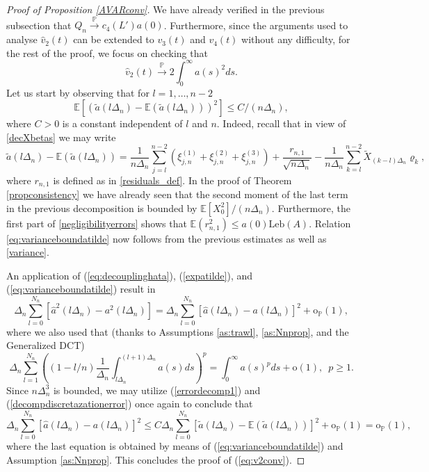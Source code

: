 \documentclass{article}
\theoremstyle{plain}
\theoremstyle{definition}
\theoremstyle{remark}
\begin{document}
\begin{appendix}
\begin{proof}[Proof of Proposition \ref{AVARconv}] We have already verified in the previous subsection
	that \linebreak $Q_{n}\overset{\mathbb{P}}{\rightarrow}c_{4}(L')a(0)$. Furthermore,
	since the arguments used to analyse $\hat{v}_{2}(t)$ can be extended
	to $v_{3}(t)$ and $v_{4}(t)$ without any difficulty, for the rest
	of the proof, we focus on checking that 
	\begin{equation}
		\hat{v}_{2}(t)\overset{\mathbb{P}}{\rightarrow}2\int_{0}^{\infty}a(s)^{2}ds.\label{eq:v2conv}
	\end{equation}
Let us start by observing that for $l=1,\ldots,n-2$
\begin{equation}
	\mathbb{E}[(\tilde{a}(l\Delta_{n})-\mathbb{E}(\tilde{a}(l\Delta_{n})))^{2}]\leq C/(n\Delta_{n}),\label{eq:varianceboundatilde}
\end{equation}
where $C>0$ is a constant independent of $l$ and $n$. Indeed, recall that in view of \eqref{decXbetas} we may write
\[\tilde{a}(l\Delta_{n})-\mathbb{E}(\tilde{a}(l\Delta_{n}))=\frac{1}{n\Delta_{n}}\sum_{j=l}^{n-2}(\xi_{j,n}^{(1)}+\xi_{j,n}^{(2)}+\xi_{j,n}^{(3)})+\frac{r_{n,1}}{\sqrt{n\Delta_{n}}}-\frac{1}{n\Delta_{n}}\sum_{k=l}^{n-2}\tilde{X}_{(k-l)\Delta_{n}}\varrho_{k},
\]
where $r_{n,1}$ is defined as in \eqref{residuals_def}. In the proof of Theorem  \ref{propconsistency} we have already seen that the second moment of the last term in the previous decomposition is bounded by $\mathbb{E}[X_{0}^{2}]/(n\Delta_n)$. Furthermore, the first part of \eqref{negligibilityerrors} shows that $\mathbb{E}(r_{n,1}^2)\leq a(0)\mathrm{Leb}(A)$. Relation \eqref{eq:varianceboundatilde} now follows from the previous estimates as well as \eqref{variance}.

	An application of (\ref{eq:decouplinghata}), (\ref{expatilde}),
	and (\ref{eq:varianceboundatilde}) result in
	\[
	\Delta_{n}\sum_{l=0}^{N_{n}}[\hat{a}^{2}(l\Delta_{n})-a^{2}(l\Delta_{n})]=\Delta_{n}\sum_{l=0}^{N_{n}}[\hat{a}(l\Delta_{n})-a(l\Delta_{n})]^{2}+\mathrm{o}_{\mathbb{P}}(1),
	\]
	where we also used that (thanks to Assumptions \ref{as:trawl}, \ref{as:Nnprop}, and
	the Generalized DCT)
	\[
	\Delta_{n}\sum_{l=1}^{N_{n}}\left((1-l/n)\frac{1}{\Delta_{n}}\int_{l\Delta_{n}}^{(l+1)\Delta_{n}}a(s)ds \right) ^{p}=\int_{0}^{\infty}a(s)^{p}ds+\mathrm{o}(1),\,\,\,p\geq1.
	\]
	Since $n\Delta_{n}^{3}$ is bounded, we may utilize (\ref{errordecomp1})
	and (\ref{decompdiscretazationerror}) once again to conclude that
	\[
	\Delta_{n}\sum_{l=0}^{N_{n}}[\hat{a}(l\Delta_{n})-a(l\Delta_{n})]^{2}\leq C\Delta_{n}\sum_{l=0}^{N_{n}}[\tilde{a}(l\Delta_{n})-\mathbb{E}(\tilde{a}(l\Delta_{n}))]^{2}+\mathrm{o}_{\mathbb{P}}(1)=\mathrm{o}_{\mathbb{P}}(1),
	\]
	where the last equation is obtained by means of (\ref{eq:varianceboundatilde})
	and Assumption \ref{as:Nnprop}. This concludes the proof of (\ref{eq:v2conv}).\end{proof}


\end{appendix}
\end{document}

